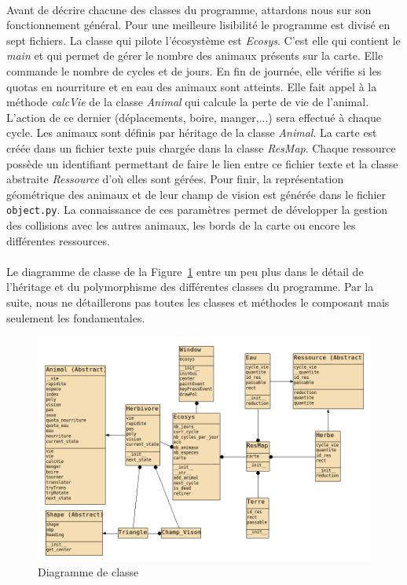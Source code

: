 \documentclass[a4paper,11pt,final,oneside]{article}
\begin{document}
\paragraph{} Avant de décrire chacune des classes du programme, attardons nous sur son fonctionnement général. Pour une meilleure lisibilité le programme est divisé en sept fichiers. La classe qui pilote l'écosystème est \textit{Ecosys}. C'est elle qui contient le \textit{main} et qui permet de gérer le nombre des animaux présents sur la carte. Elle commande le nombre de cycles et de jours. En fin de journée, elle vérifie si les quotas en nourriture et en eau des animaux sont atteints. Elle fait appel à la méthode \textit{calcVie} de la classe \textit{Animal} qui calcule la perte de vie de l'animal. L'action de ce dernier (déplacements, boire, manger,...) sera effectué à chaque cycle. Les animaux sont définis par héritage de la classe \textit{Animal}. La carte est créée dans un fichier texte puis chargée dans la classe \textit{ResMap}. Chaque ressource possède un identifiant permettant de faire le lien entre ce fichier texte et la classe abstraite \textit{Ressource} d'où elles sont gérées. Pour finir, la représentation géométrique des animaux et de leur champ de vision est générée dans le fichier \texttt{object.py}. La connaissance de ces paramètres permet de développer la gestion des collisions avec les autres animaux, les bords de la carte ou encore les différentes ressources.

\paragraph{} Le diagramme de classe de la Figure~\ref{fig:diag} entre un peu plus dans le détail de l'héritage et du polymorphisme des différentes classes du programme. Par la suite, nous ne détaillerons pas toutes les classes et méthodes le composant mais seulement les fondamentales.

\begin{figure}[h!]
\includegraphics[width=\textwidth]{diag_eco}
\caption{Diagramme de classe}
\label{fig:diag}
\end{figure}
\end{document}
